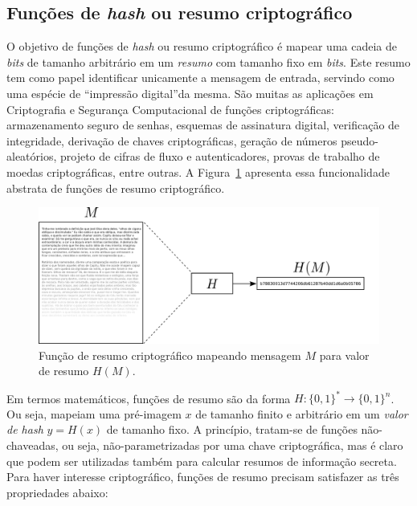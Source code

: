 \subsection{Funções de \emph{hash} ou resumo criptográfico}

O objetivo de funções de \emph{hash} ou resumo criptográfico é mapear uma cadeia de \emph{bits} de tamanho arbitrário em um \emph{resumo} com tamanho fixo em \emph{bits}. Este resumo tem como papel identificar unicamente a mensagem de entrada, servindo como uma espécie de ``impressão digital''da mesma. São muitas as aplicações em Criptografia e Segurança Computacional de funções criptográficas: armazenamento seguro de senhas, esquemas de assinatura digital, verificação de integridade, derivação de chaves criptográficas, geração de números pseudo-aleatórios, projeto de cifras de fluxo e autenticadores, provas de trabalho de moedas criptográficas, entre outras. A Figura~\ref{fig:hash} apresenta essa funcionalidade abstrata de funções de resumo criptográfico.

\begin{figure}[htbp]
\begin{center}
    \includegraphics[scale=0.25]{figures/hash.pdf}
    \caption{Função de resumo criptográfico mapeando mensagem $M$ para valor de resumo $H(M)$.}
    \label{fig:hash}
\end{center}
\end{figure}

Em termos matemáticos, funções de resumo são da forma $H : \{0,1\}^* \rightarrow \{0,1\}^n$. Ou seja, mapeiam uma pré-imagem $x$ de tamanho finito e arbitrário em um \emph{valor de hash} $y = H(x)$ de tamanho fixo. A princípio, tratam-se de funções não-chaveadas, ou seja, não-parametrizadas por uma chave criptográfica, mas é claro que podem ser utilizadas também para calcular resumos de informação secreta. Para haver interesse criptográfico, funções de resumo precisam satisfazer as três propriedades abaixo:


